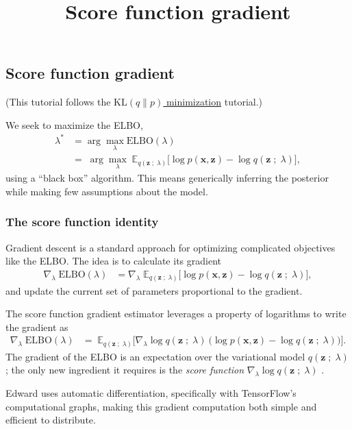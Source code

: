 \title{Score function gradient}

\subsection{Score function gradient}

(This tutorial follows the
\href{/tutorials/klqp}{$\text{KL}(q\|p)$ minimization} tutorial.)

We seek to maximize the ELBO,
\begin{align*}
  \lambda^*
  &=
  \arg \max_\lambda \text{ELBO}(\lambda)\\
  &=\;
  \arg \max_\lambda\;
  \mathbb{E}_{q(\mathbf{z}\;;\;\lambda)}
  \big[
  \log p(\mathbf{x}, \mathbf{z})
  -
  \log q(\mathbf{z}\;;\;\lambda)
  \big],
\end{align*}
using a ``black box'' algorithm. This means generically inferring the
posterior while making few assumptions about the model.

\subsubsection{The score function identity}

Gradient descent is a standard approach for optimizing complicated
objectives like the ELBO. The idea is to calculate its gradient
\begin{align*}
  \nabla_\lambda\;
  \text{ELBO}(\lambda)
  &=
  \nabla_\lambda\;
  \mathbb{E}_{q(\mathbf{z}\;;\;\lambda)}
  \big[
  \log p(\mathbf{x}, \mathbf{z})
  -
  \log q(\mathbf{z}\;;\;\lambda)
  \big],
\end{align*}
and update the current set of parameters proportional to the gradient.

The score function gradient estimator leverages a property of
logarithms to write the gradient as
\begin{align*}
  \nabla_\lambda\;
  \text{ELBO}(\lambda)
  &=\;
  \mathbb{E}_{q(\mathbf{z}\;;\;\lambda)}
  \big[
  \nabla_\lambda \log q(\mathbf{z}\;;\;\lambda)
  \:
  \big(
  \log p(\mathbf{x}, \mathbf{z})
  -
  \log q(\mathbf{z}\;;\;\lambda)
  \big)
  \big].
\end{align*}
The gradient of the ELBO is an expectation over the variational
model $q(\mathbf{z}\;;\;\lambda)$; the only new ingredient it requires is the
\emph{score function} $\nabla_\lambda \log q(\mathbf{z}\;;\;\lambda)$
\citep{paisley2012variational,ranganath2014black}.

Edward uses automatic differentiation, specifically with TensorFlow's
computational graphs, making this gradient computation both simple and
efficient to distribute.

